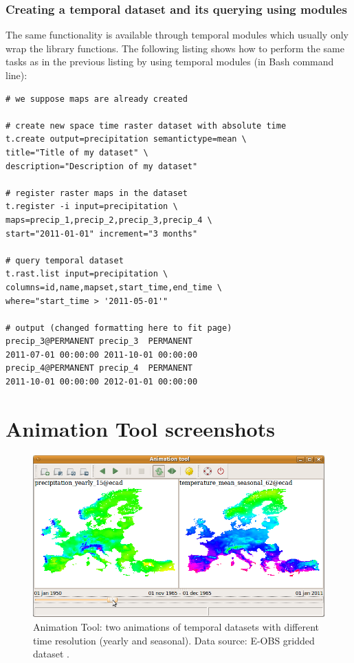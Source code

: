 \documentclass[a4paper,12pt,oneside]{book}
\newcommand{\at}{Animation Tool\xspace}
\begin{document}
\subsection*{Creating a temporal dataset and its querying using modules}
The same functionality is available through temporal modules
which usually only wrap the library functions.
The following listing shows how to perform the same tasks as in the previous
listing by using temporal modules (in Bash command line):
\begin{small}
\begin{lstlisting}[style=python]
# we suppose maps are already created

# create new space time raster dataset with absolute time
t.create output=precipitation semantictype=mean \
title="Title of my dataset" \
description="Description of my dataset"

# register raster maps in the dataset
t.register -i input=precipitation \
maps=precip_1,precip_2,precip_3,precip_4 \
start="2011-01-01" increment="3 months"

# query temporal dataset
t.rast.list input=precipitation \
columns=id,name,mapset,start_time,end_time \
where="start_time > '2011-05-01'"

# output (changed formatting here to fit page)
precip_3@PERMANENT precip_3  PERMANENT
2011-07-01 00:00:00 2011-10-01 00:00:00
precip_4@PERMANENT precip_4  PERMANENT
2011-10-01 00:00:00 2012-01-01 00:00:00

\end{lstlisting}
\end{small}

\chapter{\at screenshots}
\label{appdx:animation}
\begin{figure}[h!]
  \centering
  \includegraphics[width=\textwidth]{./images/animation_tool1.png}
  \caption[\at: two animations of temporal datasets with different time resolution (yearly and seasonal)]
  {\at: two animations of temporal datasets with different time resolution (yearly and seasonal).
  Data source: E-OBS gridded dataset \cite{haylock2008european}.}
  \label{fig:anim2D}
\end{figure}
\end{document}
